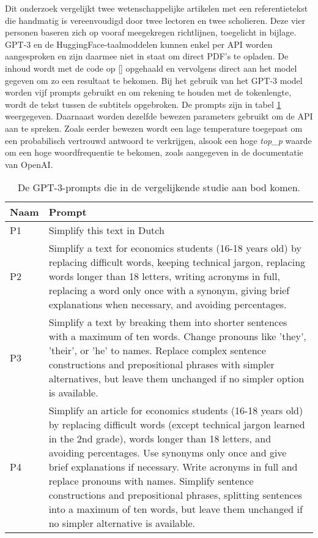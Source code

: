 \medspace

Dit onderzoek vergelijkt twee wetenschappelijke artikelen met een referentietekst die handmatig is vereenvoudigd door twee lectoren en twee scholieren. Deze vier personen baseren zich op vooraf meegekregen richtlijnen, toegelicht in bijlage. GPT-3 en de HuggingFace-taalmoddelen kunnen enkel per API worden aangesproken en zijn daarmee niet in staat om direct PDF's te opladen. De inhoud wordt met de code op \ref{} opgehaald en vervolgens direct aan het model gegeven om zo een resultaat te bekomen. Bij het gebruik van het GPT-3 model worden vijf prompts gebruikt en om rekening te houden met de tokenlengte, wordt de tekst tussen de subtitels opgebroken. De prompts zijn in tabel \ref{table:tested-prompts} weergegeven. Daarnaast worden dezelfde bewezen parameters gebruikt om de API aan te spreken. Zoals eerder bewezen wordt een lage temperature toegepast om een probabilisch vertrouwd antwoord te verkrijgen, alsook een hoge \textit{top\_p} waarde om een hoge woordfrequentie te bekomen, zoals aangegeven in de documentatie van OpenAI.

\begin{center}
	\begin{table}[H]
	\begin{tabular}{ | m{2cm} | m{14cm} | } 
		\hline
		\textbf{Naam} & \textbf{Prompt} \\
		\hline
		P1 & Simplify this text in Dutch \\
		\hline
		P2 & Simplify a text for economics students (16-18 years old) by replacing difficult words, keeping technical jargon, replacing words longer than 18 letters, writing acronyms in full, replacing a word only once with a synonym, giving brief explanations when necessary, and avoiding percentages. \\
		\hline
		P3 & Simplify a text by breaking them into shorter sentences with a maximum of ten words. Change pronouns like 'they', 'their', or 'he' to names. Replace complex sentence constructions and prepositional phrases with simpler alternatives, but leave them unchanged if no simpler option is available. \\
		\hline
		P4 & Simplify an article for economics students (16-18 years old) by replacing difficult words (except technical jargon learned in the 2nd grade), words longer than 18 letters, and avoiding percentages. Use synonyms only once and give brief explanations if necessary. Write acronyms in full and replace pronouns with names. Simplify sentence constructions and prepositional phrases, splitting sentences into a maximum of ten words, but leave them unchanged if no simpler alternative is available. \\
		\hline
	\end{tabular}
	\label{table:tested-prompts}
	\caption{De GPT-3-prompts die in de vergelijkende studie aan bod komen.}
	\end{table}
\end{center}

